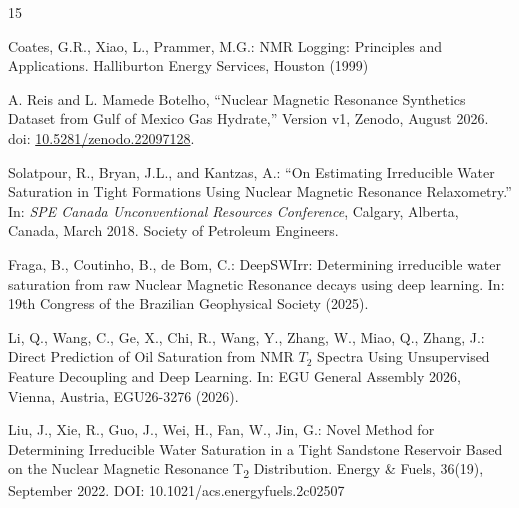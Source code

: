 \documentclass[runningheads]{llncs}
\begin{document}

\begin{thebibliography}{15}


Coates, G.R., Xiao, L., Prammer, M.G.:
NMR Logging: Principles and Applications.
Halliburton Energy Services, Houston (1999)


A. Reis and L. Mamede Botelho,
``Nuclear Magnetic Resonance Synthetics Dataset from Gulf of Mexico Gas Hydrate,'' Version v1,
Zenodo, August 2026.  
doi: \href{https://doi.org/10.5281/zenodo.22097128}{10.5281/zenodo.22097128}.




Solatpour, R., Bryan, J.L., and Kantzas, A.:
``On Estimating Irreducible Water Saturation in Tight Formations Using Nuclear Magnetic Resonance Relaxometry.''
In: \textit{SPE Canada Unconventional Resources Conference},
Calgary, Alberta, Canada, March 2018.
Society of Petroleum Engineers.


Fraga, B., Coutinho, B., de Bom, C.:
DeepSWIrr: Determining irreducible water saturation from raw Nuclear Magnetic Resonance decays using deep learning.
In: 19th Congress of the Brazilian Geophysical Society (2025).

Li, Q., Wang, C., Ge, X., Chi, R., Wang, Y., Zhang, W., Miao, Q., Zhang, J.:
Direct Prediction of Oil Saturation from NMR $T_2$ Spectra Using Unsupervised Feature
Decoupling and Deep Learning.
In: EGU General Assembly 2026, Vienna, Austria, EGU26-3276 (2026).




Liu, J., Xie, R., Guo, J., Wei, H., Fan, W., Jin, G.:
Novel Method for Determining Irreducible Water Saturation in a Tight Sandstone Reservoir Based on the Nuclear Magnetic Resonance T\textsubscript{2} Distribution.
Energy \& Fuels, 36(19), September 2022.
DOI: 10.1021/acs.energyfuels.2c02507






\end{thebibliography}
\end{document}
